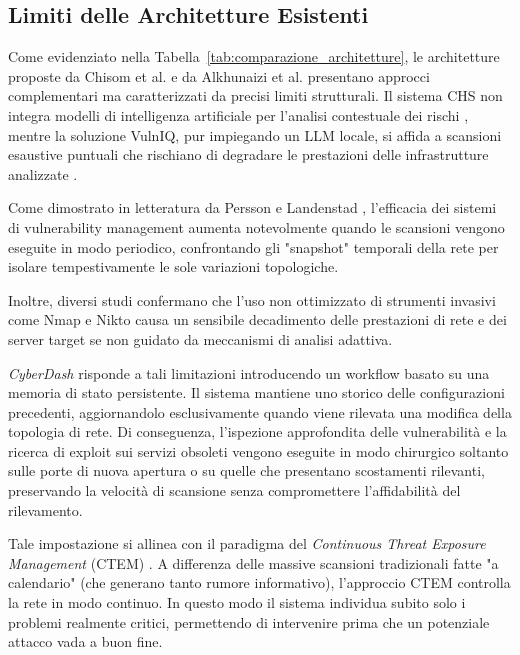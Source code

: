 \documentclass{article}
\begin{document}
\subsection{Limiti delle Architetture Esistenti}
Come evidenziato nella Tabella~\ref{tab:comparazione_architetture}, le architetture proposte da Chisom et al. \cite{chisom_cyberhygienescan_2025} e da Alkhunaizi et al. \cite{alkhunaizi_toward_2025} presentano approcci complementari ma caratterizzati da precisi limiti strutturali. Il sistema CHS non integra modelli di intelligenza artificiale per l'analisi contestuale dei rischi \cite{chisom_cyberhygienescan_2025}, mentre la soluzione VulnIQ, pur impiegando un LLM locale, si affida a scansioni esaustive puntuali che rischiano di degradare le prestazioni delle infrastrutture analizzate \cite{alkhunaizi_toward_2025}. 

Come dimostrato in letteratura da Persson e Landenstad \cite{persson_explaining_2018}, l'efficacia dei sistemi di vulnerability management aumenta notevolmente quando le scansioni vengono eseguite in modo periodico, confrontando gli "snapshot" temporali della rete per isolare tempestivamente le sole variazioni topologiche.

Inoltre, diversi studi \cite{gajula_evaluating_2024, jha_canvus_2010} confermano che l'uso non ottimizzato di strumenti invasivi come Nmap e Nikto causa un sensibile decadimento delle prestazioni di rete e dei server target se non guidato da meccanismi di analisi adattiva. 

\textit{CyberDash} risponde a tali limitazioni introducendo un workflow basato su una memoria di stato persistente. Il sistema mantiene uno storico delle configurazioni precedenti, aggiornandolo esclusivamente quando viene rilevata una modifica della topologia di rete. Di conseguenza, l'ispezione approfondita delle vulnerabilità e la ricerca di exploit sui servizi obsoleti vengono eseguite in modo chirurgico soltanto sulle porte di nuova apertura o su quelle che presentano scostamenti rilevanti, preservando la velocità di scansione senza compromettere l'affidabilità del rilevamento.

Tale impostazione si allinea con il paradigma del \textit{Continuous Threat Exposure Management} (CTEM) \cite{gartner_ctem_2023}. A differenza delle massive scansioni tradizionali fatte "a calendario" (che generano tanto rumore informativo), l'approccio CTEM controlla la rete in modo continuo. In questo modo il sistema individua subito solo i problemi realmente critici, permettendo di intervenire prima che un potenziale attacco vada a buon fine.
\end{document}
